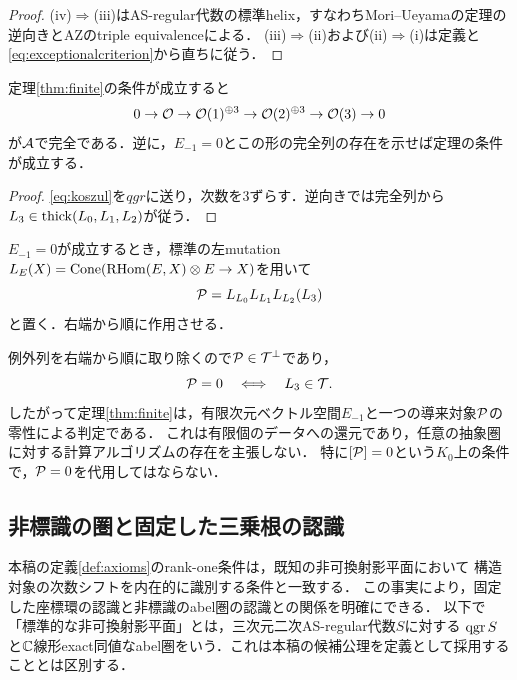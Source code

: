 \documentclass[11pt,a4paper]{ltjsarticle}
\begin{document}
\begin{proof}
(iv)$\Rightarrow$(iii)はAS-regular代数の標準helix，すなわちMori--Ueyamaの定理の逆向きとAZのtriple equivalenceによる．
(iii)$\Rightarrow$(ii)および(ii)$\Rightarrow$(i)は定義と\eqref{eq:exceptionalcriterion}から直ちに従う．
\end{proof}

\begin{corollary}[heart内の生成証明書]\label{cor:certificate}
定理\ref{thm:finite}の条件が成立すると
\begin{equation}\label{eq:certificate}
 0\to\mathcal O\to\mathcal O(1)^{\oplus3}\to\mathcal O(2)^{\oplus3}\to\mathcal O(3)\to0
\end{equation}
が$\mathcal A$で完全である．逆に，$E_{-1}=0$とこの形の完全列の存在を示せば定理の条件が成立する．
\end{corollary}
\begin{proof}
\eqref{eq:koszul}を$qgr$に送り，次数を3ずらす．逆向きでは完全列から$L_3\in\operatorname{thick}(L_0,L_1,L_2)$が従う．
\end{proof}

\begin{definition}[生成障害]\label{def:defect}
$E_{-1}=0$が成立するとき，標準の左mutation
$L_E(X)=\operatorname{Cone}(\operatorname{RHom}(E,X)\otimes E\to X)$を用いて
\begin{equation}\label{eq:defect}
 \mathcal P=L_{L_0}L_{L_1}L_{L_2}(L_3)
\end{equation}
と置く．右端から順に作用させる．
\end{definition}
例外列を右端から順に取り除くので$\mathcal P\in\mathcal T^\perp$であり，
\[
 \mathcal P=0\quad\Longleftrightarrow\quad L_3\in\mathcal T.
\]
したがって定理\ref{thm:finite}は，有限次元ベクトル空間$E_{-1}$と一つの導来対象$\mathcal P$の零性による判定である．
これは有限個のデータへの還元であり，任意の抽象圏に対する計算アルゴリズムの存在を主張しない．
特に$[\mathcal P]=0$という$K_0$上の条件で，$\mathcal P=0$を代用してはならない．

\subsection{非標識の圏と固定した三乗根の認識}\label{subsec:v9-marking-independence}
本稿の定義\ref{def:axioms}のrank-one条件は，既知の非可換射影平面において
構造対象の次数シフトを内在的に識別する条件と一致する．
この事実により，固定した座標環の認識と非標識のabel圏の認識との関係を明確にできる．
以下で「標準的な非可換射影平面」とは，三次元二次AS-regular代数$S$に対する
$\operatorname{qgr} S$と$\mathbb C$線形exact同値なabel圏をいう．これは本稿の候補公理を定義として採用することとは区別する．
\end{document}
